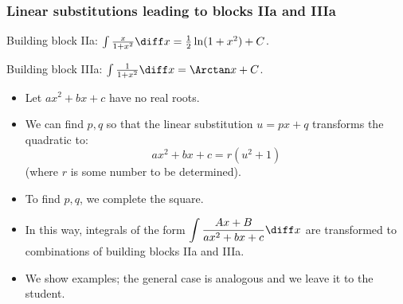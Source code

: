 \begin{frame}
\frametitle{Linear substitutions leading to blocks IIa and IIIa}
Building block IIa: \alert<4>{$ \int \frac{x}{1+x^2}\diff x = \frac{1}{2}\ln(1+x^2)+C$}.

Building block IIIa: \alert<4>{$\int \frac{1}{1+x^2 }\diff x=\Arctan x+C$}.

\begin{itemize}

\item<1-> Let $ax^2+bx+c$ have no real roots.
\item<2-> We can find $p,q$ so that the linear substitution $u=px+q$ transforms the quadratic to:
\[
ax^2+bx+c= r(u^2+1)
\] 
(where $r$ is some number to be determined).
\item<3-> To find $p,q$, we \alert<3>{complete the square}. 
\item<4-> In this way, integrals of the form \alert<4>{$\displaystyle \int \frac{Ax+B}{ax^2+bx+c} \diff x$} are transformed to \alert<4>{combinations of building blocks IIa and IIIa}.

\item<5-> We show examples; the general case is analogous and we leave it to the student.
\end{itemize}
\vspace{5cm}
\end{frame}